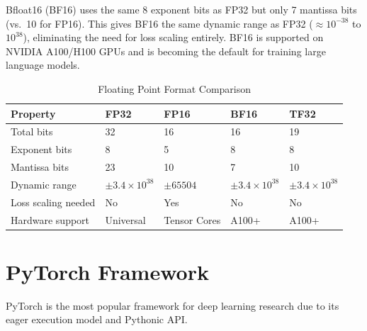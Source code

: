 Bfloat16 (BF16) uses the same 8 exponent bits as FP32 but only 7 mantissa bits (vs.\ 10 for FP16). This gives BF16 the same dynamic range as FP32 ($\approx 10^{-38}$ to $10^{38}$), eliminating the need for loss scaling entirely. BF16 is supported on NVIDIA A100/H100 GPUs and is becoming the default for training large language models.

\begin{table}[ht]
    \centering
    \caption{Floating Point Format Comparison}
    \begin{tabular}{L{2.5cm} M{1.5cm} M{1.5cm} M{1.5cm} M{3cm}}
        \toprule
        \textbf{Property} & \textbf{FP32} & \textbf{FP16} & \textbf{BF16} & \textbf{TF32} \\
        \midrule
        Total bits & 32 & 16 & 16 & 19 \\
        Exponent bits & 8 & 5 & 8 & 8 \\
        Mantissa bits & 23 & 10 & 7 & 10 \\
        Dynamic range & $\pm 3.4 \times 10^{38}$ & $\pm 65504$ & $\pm 3.4 \times 10^{38}$ & $\pm 3.4 \times 10^{38}$ \\
        Loss scaling needed & No & Yes & No & No \\
        Hardware support & Universal & Tensor Cores & A100+ & A100+ \\
        \bottomrule
    \end{tabular}
\end{table}

\section{PyTorch Framework}

PyTorch is the most popular framework for deep learning research due to its eager execution model and Pythonic API.

